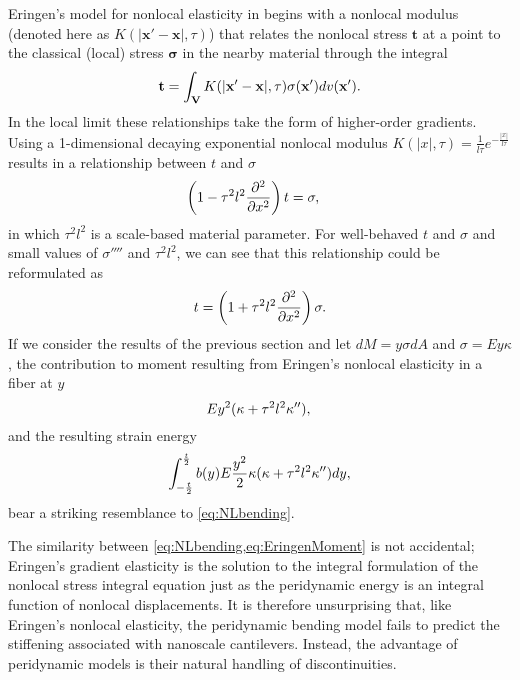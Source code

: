 \documentclass[5p,twocolumn]{elsarticle}
\begin{document}
Eringen's model for nonlocal elasticity in \cite{eringen1983differential} begins with a nonlocal modulus (denoted here as \(K(|\mathbf{x}'-\mathbf{x}|,\tau)\)) that relates the nonlocal stress \(\mathbf{t}\) at a point to the classical (local) stress \(\boldsymbol{\sigma}\) in the nearby material through the integral
\begin{equation}
\mathbf{t} = \int_\mathbf{V} K(|\mathbf{x}'-\mathbf{x}|,\tau)\sigma(\mathbf{x}')dv(\mathbf{x}').\notag
\end{equation}
In the local limit these relationships take the form of higher-order gradients.
Using a 1-dimensional decaying exponential nonlocal modulus \(K(|x|,\tau)=\frac{1}{l\tau}e^{-\frac{|x|}{l\tau}}\)results in a relationship between \(t\) and \(\sigma\) 
\begin{align}
\left(1-\tau^2l^2\frac{\partial^2}{\partial x^2}\right)t&=\sigma,\notag
\end{align}
in which \(\tau^2l^2\) is a scale-based material parameter.
For well-behaved \(t\) and \(\sigma\) and small values of \(\sigma''''\) and \(\tau^2l^2\), we can see that this relationship could be reformulated as
\begin{equation}
\label{eq:NLstress}
t=\left(1+\tau^2l^2\frac{\partial^2}{\partial x^2}\right)\sigma.\notag
\end{equation}
If we consider the results of the previous section and let \(dM = y\sigma dA\) and \(\sigma = Ey\kappa\), the contribution to moment resulting from Eringen's nonlocal elasticity in a fiber at \(y\)
\begin{equation}
\label{eq:EringenMoment}
E y^2 (\kappa+\tau^2l^2\kappa''), \\
\end{equation}
and the resulting strain energy
\begin{equation}
\label{eq:EringenEnergy}
\int_{-\frac{t}{2}}^{\frac{t}{2}} b(y) E \frac{y^2}{2} \kappa (\kappa+\tau^2l^2\kappa'')  dy,\notag
\end{equation}
bear a striking resemblance to \cref{eq:NLbending}.

The similarity between \cref{eq:NLbending,eq:EringenMoment} is not accidental; Eringen's gradient elasticity is the solution to the integral formulation of the nonlocal stress integral equation just as the peridynamic energy is an integral function of nonlocal displacements.
It is therefore unsurprising that, like Eringen's nonlocal elasticity, the peridynamic bending model fails to predict the stiffening associated with nanoscale cantilevers.
Instead, the advantage of peridynamic models is their natural handling of discontinuities.
\end{document}
